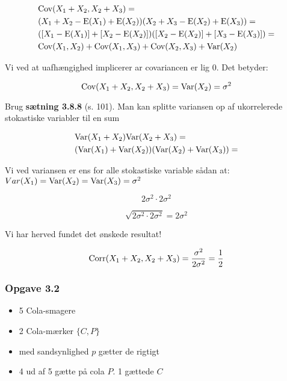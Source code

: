 \begin{align}
    &\text{Cov}(X_1 + X_2,X_2 + X_3) = \\ &(X_1 + X_2 - \text{E}(X_1) + \text{E}(X_2))(X_2 + X_3 - \text{E}(X_2) + \text{E}(X_3)) = \\
    &([X_1 - \text{E}(X_1)]+[X_2 - \text{E}(X_2)])([X_2 - \text{E}(X_2)] + [X_3 - \text{E}(X_3)]) = \\
    &\text{Cov}(X_1, X_2) + \text{Cov}(X_1, X_3) + \text{Cov}(X_2, X_3) + \text{Var}(X_2) 
\end{align}

Vi ved at uafhængighed implicerer ar covariancen er lig 0. Det betyder:

\begin{equation}
    \text{Cov}(X_1 + X_2,X_2 + X_3) = \text{Var}(X_2) = \sigma^2
\end{equation}

Brug \textbf{sætning 3.8.8} (s. 101). Man kan splitte variansen op af ukorrelerede stokastiske variabler til en sum

\begin{align}
    &\text{Var}(X_1 + X_2)\text{Var}(X_2 + X_3) = \\
    &(\text{Var}(X_1) + \text{Var}(X_2))(\text{Var}(X_2) + \text{Var}(X_3)) = \\
\end{align}

Vi ved variansen er ens for alle stokastiske variable sådan at: $Var(X_1) = \text{Var}(X_2) = \text{Var}(X_3) = \sigma^2$

\begin{equation}
    2\sigma^2 \cdot 2\sigma^2
\end{equation}

\begin{equation}
    \sqrt{2\sigma^2 \cdot 2\sigma^2} = 2\sigma^2
\end{equation}

Vi har herved fundet det ønskede resultat!

\begin{equation}
    \text{Corr}(X_1 + X_2, X_2 + X_3) = \frac{\sigma^2}{2\sigma^2} =\frac{1}{2}
\end{equation}

\subsubsection{Opgave 3.2}

\begin{itemize}
    \item 5 Cola-smagere
    \item 2 Cola-mærker $\{C, P\}$
    \item med sandsynlighed $p$ gætter de rigtigt
    \item 4 ud af 5 gætte på cola $P$. 1 gættede $C$
\end{itemize}

